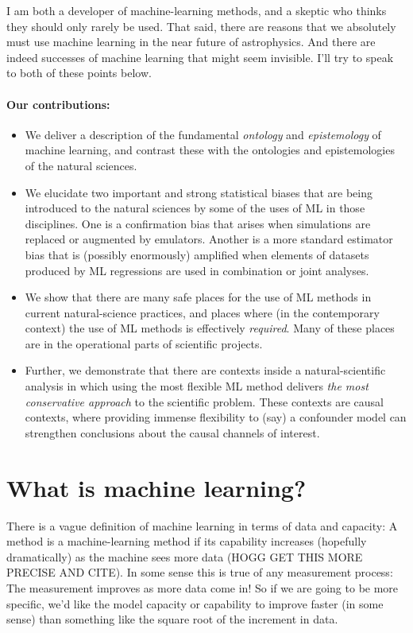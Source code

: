 \documentclass[11pt]{article}
\begin{document}
I am both a developer of machine-learning methods, and a skeptic who thinks they should only rarely be used.
That said, there are reasons that we absolutely must use machine learning in the near future of astrophysics.
And there are indeed successes of machine learning that might seem invisible.
I'll try to speak to both of these points below.

\paragraph{Our contributions:}
\begin{itemize}
  \item We deliver a description of the fundamental \emph{ontology} and \emph{epistemology} of machine learning, and contrast these with the ontologies and epistemologies of the natural sciences.
  \item We elucidate two important and strong statistical biases that are being introduced to the natural sciences by some of the uses of ML in those disciplines. One is a confirmation bias that arises when simulations are replaced or augmented by emulators. Another is a more standard estimator bias that is (possibly enormously) amplified when elements of datasets produced by ML regressions are used in combination or joint analyses.
  \item We show that there are many safe places for the use of ML methods in current natural-science practices, and places where (in the contemporary context) the use of ML methods is effectively \emph{required}. Many of these places are in the operational parts of scientific projects.
  \item Further, we demonstrate that there are contexts inside a natural-scientific analysis in which using the most flexible ML method delivers \emph{the most conservative approach} to the scientific problem. These contexts are causal contexts, where providing immense flexibility to (say) a confounder model can strengthen conclusions about the causal channels of interest.
\end{itemize}

\section{What is machine learning?}\label{sec:what}

There is a vague definition of machine learning in terms of data and capacity:
A method is a machine-learning method if its capability increases (hopefully dramatically) as the machine sees more data (HOGG GET THIS MORE PRECISE AND CITE).
In some sense this is true of any measurement process:
The measurement improves as more data come in!
So if we are going to be more specific, we'd like the model capacity or capability to improve faster (in some sense) than something like the square root of the increment in data.
\end{document}
